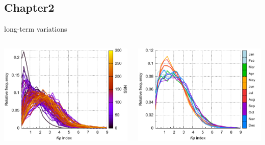 \subsection{Chapter2}

\begin{frame}[c]{\Kp{} long-term variations}{}
	\begin{columns}[c]
		
		\includegraphics[width=\textwidth]{../figures_of_mine/chapter2/Kp_histogram_yearlySSN_b.pdf}
		
		
		\includegraphics[width=\textwidth]{../figures_of_mine/chapter2/Kp_histogram_monthly.pdf}
	\end{columns}
\end{frame}


